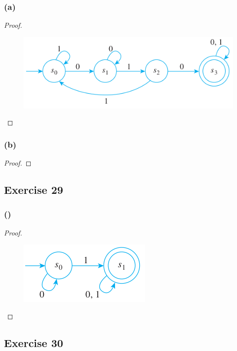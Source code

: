 \documentclass[14pt]{extarticle}
\begin{document}
\subsubsection{(a)}

\begin{proof}
\begin{figure}[ht!]
\centering
\includegraphics[scale=0.5]{../images/12.2.28.a.png}
\end{figure}
\end{proof}

\subsubsection{(b)}

\begin{proof}

\end{proof}

\subsection{Exercise 29}

\subsubsection{()}

\begin{proof}
\begin{figure}[ht!]
\centering
\includegraphics[scale=0.5]{../images/12.2.29.png}
\end{figure}
\end{proof}

\subsection{Exercise 30}
\end{document}
